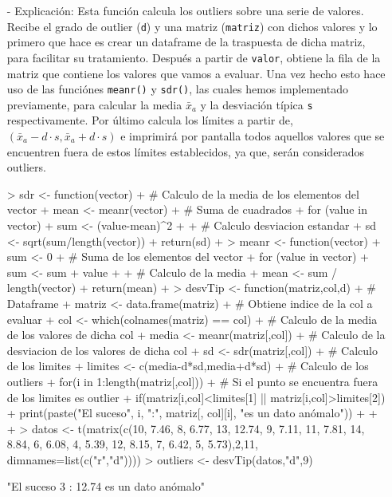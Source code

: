 \documentclass[a4paper, 12pt]{article}
\begin{document}
\begin{itemize}
\begin{itemize}
				\item[-] Explicación: Esta función calcula los outliers sobre una serie de valores. Recibe el grado de outlier (\texttt{d}) y una matriz (\texttt{matriz}) con dichos valores y lo primero que hace es crear un dataframe de la traspuesta de dicha matriz, para facilitar su tratamiento. Después a partir de \texttt{valor}, obtiene la fila de la matriz que contiene los valores que vamos a evaluar. Una vez hecho esto hace uso de las funciónes \texttt{meanr()} y \texttt{sdr()}, las cuales hemos implementado previamente, para calcular la media \texttt{$\bar{x}$$_{a}$} y la desviación típica \texttt{s} respectivamente. Por último calcula los límites a partir de, \texttt{$(\bar{x}_{a} - d \cdot s, \bar{x}_{a} + d \cdot s)$} e imprimirá por pantalla todos aquellos valores que se encuentren fuera de estos límites establecidos, ya que, serán considerados outliers.
\begin{Schunk}
\begin{Sinput}
> sdr <- function(vector) {
+     # Calculo de la media de los elementos del vector
+     mean <- meanr(vector)
+     # Suma de cuadrados
+     for (value in vector) {
+         sum <- (value-mean)^2
+     }
+     # Calculo desviacion estandar
+     sd <- sqrt(sum/length(vector))
+     return(sd)
+ }
> meanr <- function(vector) {
+   sum <- 0
+   # Suma de los elementos del vector
+   for (value in vector) {
+     sum <- sum + value
+   }
+   # Calculo de la media
+   mean <- sum / length(vector)   
+   return(mean)
+ }
> desvTip <- function(matriz,col,d){
+     # Dataframe
+     matriz <- data.frame(matriz)
+     # Obtiene indice de la col a evaluar
+     col <- which(colnames(matriz) == col)
+     # Calculo de la media de los valores de dicha col
+     media <- meanr(matriz[,col])
+     # Calculo de la desviacion de los valores de dicha col
+     sd <- sdr(matriz[,col])
+     # Calculo de los limites
+     limites <- c(media-d*sd,media+d*sd)
+     # Calculo de los outliers
+     for(i in 1:length(matriz[,col])) { 
+         # Si el punto se encuentra fuera de los limites es outlier
+         if(matriz[i,col]<limites[1] || matriz[i,col]>limites[2]) { 
+             print(paste("El suceso", i, ":", matriz[, col][i], "es un dato anómalo"))
+         }
+     }
+ }
> datos <- t(matrix(c(10, 7.46, 8, 6.77, 13, 12.74, 9, 7.11, 11, 7.81, 14, 8.84, 6, 6.08, 4, 5.39, 12, 8.15, 7, 6.42, 5, 5.73),2,11, dimnames=list(c("r","d"))))
> outliers <- desvTip(datos,"d",9)
\end{Sinput}
\begin{Soutput}
[1] "El suceso 3 : 12.74 es un dato anómalo"
\end{Soutput}
\end{Schunk}
			\end{itemize}
		\end{itemize}
		
\end{document}
